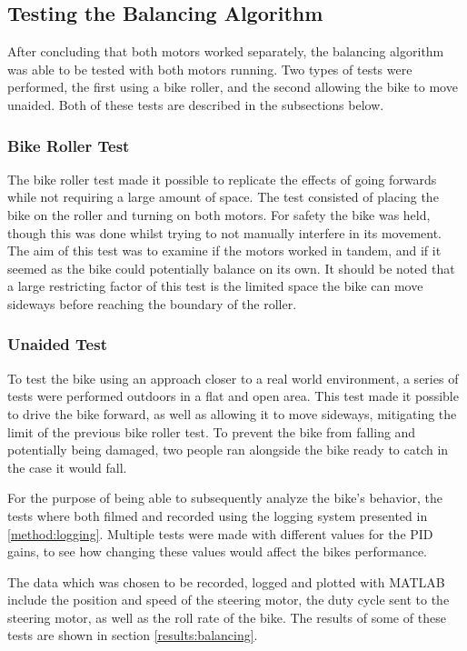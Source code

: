 \subsection{Testing the Balancing Algorithm}

After concluding that both motors worked separately, the balancing algorithm was able to be tested with both motors running. Two types of tests were performed, the first using a bike roller, and the second allowing the bike to move unaided. Both of these tests are described in the subsections below.

\subsubsection{Bike Roller Test}

The bike roller test made it possible to replicate the effects of going forwards while not requiring a large amount of space. The test consisted of placing the bike on the roller and turning on both motors. For safety the bike was held, though this was done whilst trying to not manually interfere in its movement. The aim of this test was to examine if the motors worked in tandem, and if it seemed as the bike could potentially balance on its own. It should be noted that a large restricting factor of this test is the limited space the bike can move sideways before reaching the boundary of the roller.

\subsubsection{Unaided Test} \label{method:unaidedTest}

To test the bike using an approach closer to a real world environment, a series of tests were performed outdoors in a flat and open area. This test made it possible to drive the bike forward, as well as allowing it to move sideways, mitigating the limit of the previous bike roller test. To prevent the bike from falling and potentially being damaged, two people ran alongside the bike ready to catch in the case it would fall.

For the purpose of being able to subsequently analyze the bike's behavior, the tests where both filmed and recorded using the logging system presented in \ref{method:logging}. Multiple tests were made with different values for the PID gains, to see how changing these values would affect the bikes performance. 

The data which was chosen to be recorded, logged and plotted with MATLAB include the position and speed of the steering motor, the duty cycle sent to the steering motor, as well as the roll rate of the bike. The results of some of these tests are shown in section \ref{results:balancing}.


